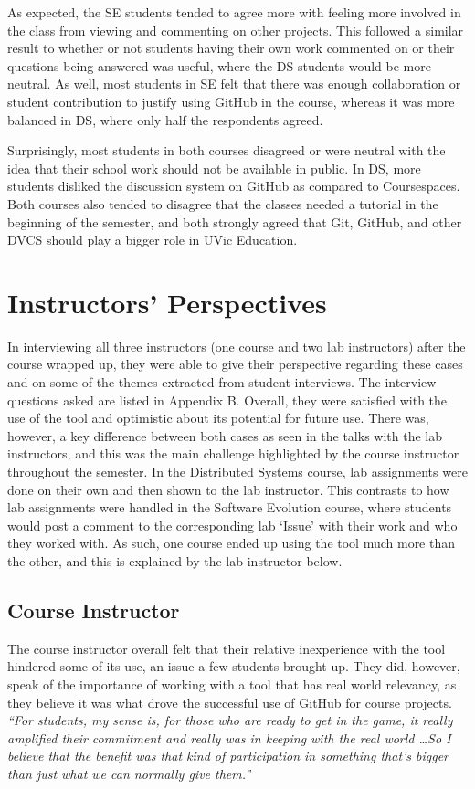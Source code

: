 As expected, the SE students tended to agree more with feeling more involved in the class from viewing and commenting on other projects. This followed a similar result to whether or not students having their own work commented on or their questions being answered was useful, where the DS students would be more neutral. As well, most students in SE felt that there was enough collaboration or student contribution to justify using GitHub in the course, whereas it was more balanced in DS, where only half the respondents agreed.

Surprisingly, most students in both courses disagreed or were neutral with the idea that their school work should not be available in public. In DS, more students disliked the discussion system on GitHub as compared to Coursespaces. Both courses also tended to disagree that the classes needed a tutorial in the beginning of the semester, and both strongly agreed that Git, GitHub, and other DVCS should play a bigger role in UVic Education.

\section{Instructors' Perspectives}
In interviewing all three instructors (one course and two lab instructors) after the course wrapped up, they were able to give their perspective regarding these cases and on some of the themes extracted from student interviews. The interview questions asked are listed in Appendix B. Overall, they were satisfied with the use of the tool and optimistic about its potential for future use. There was, however, a key difference between both cases as seen in the talks with the lab instructors, and this was the main challenge highlighted by the course instructor throughout the semester. In the Distributed Systems course, lab assignments were done on their own and then shown to the lab instructor. This contrasts to how lab assignments were handled in the Software Evolution course, where students would post a comment to the corresponding lab `Issue' with their work and who they worked with. As such, one course ended up using the tool much more than the other, and this is explained by the lab instructor below.

\subsection{Course Instructor}
The course instructor overall felt that their relative inexperience with the tool hindered some of its use, an issue a few students brought up. They did, however, speak of the importance of working with a tool that has real world relevancy, as they believe it was what drove the successful use of GitHub for course projects. \textit{``For students, my sense is, for those who are ready to get in the game, it really amplified their commitment and really was in keeping with the real world \ldots So I believe that the benefit was that kind of participation in something that's bigger than just what we can normally give them.''}


